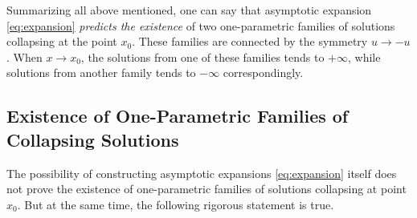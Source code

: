 Summarizing all above mentioned, one can say that asymptotic expansion \eqref{eq:expansion} {\it predicts the existence} of two one-parametric families of solutions collapsing at the point $x_0$.
These families are connected by the symmetry $u \to -u$.
When $x \to x_0$, the solutions from one of these families tends to $+\infty$, while solutions from another family tends to $-\infty$ correspondingly.

\subsection{Existence of One-Parametric Families of Collapsing Solutions}

The possibility of constructing asymptotic expansions \eqref{eq:expansion} itself does not prove the existence of one-parametric families of solutions collapsing at point $x_0$.
But at the same time, the following rigorous statement is true.

